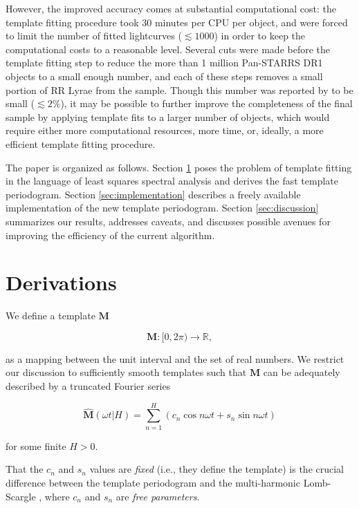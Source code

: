 \documentclass[apj]{emulateapj}
\begin{document}
However, the improved accuracy comes at substantial computational cost: the template fitting
procedure took 30 minutes per CPU per object, and \cite{Sesar_etal_2016} were forced to limit
the number of fitted lightcurves ($\lesssim 1000$) in order to keep the computational costs
to a reasonable level. Several cuts were made before the template fitting step to reduce the
more than 1 million Pan-STARRS DR1 objects to a small enough number, and each of these steps
removes a small portion of RR Lyrae from the sample. Though this number was reported by
\cite{Sesar_etal_2016} to be small ($\lesssim 2\%$), it may be possible to further improve
the completeness of the final sample by applying template fits to a larger number of objects,
which would require either more computational resources, more time, or, ideally, a more efficient
template fitting procedure.

The paper is organized as follows. Section \ref{sec:derivations} poses the problem of template
fitting in the language of least squares spectral analysis and derives the fast template
periodogram. Section \ref{sec:implementation} describes a freely available implementation
of the new template periodogram. Section \ref{sec:discussion} summarizes our results,
addresses caveats, and discusses possible avenues for improving the efficiency of the current
algorithm.


\section{Derivations}\label{sec:derivations}

We define a template $\mathbf{M}$

\begin{equation}
    \mathbf{M} : [0, 2\pi)\rightarrow\mathbb{R},
\end{equation}

\noindent as a mapping between the unit interval and the set of real numbers. We
restrict our discussion to sufficiently smooth templates such that
$\mathbf{M}$ can be adequately described by a truncated Fourier series

\begin{equation}
    \hat{\mathbf{M}}(\omega t|H) = \sum_{n=1}^H\left(c_n\cos{n\omega t} + s_n\sin{n\omega t}\right)
\end{equation}

\noindent for some finite $H > 0$.

That the $c_n$ and $s_n$ values are \emph{fixed} (i.e., they define
the template) is the crucial difference between the template periodogram and
the multi-harmonic Lomb-Scargle \citep{Palmer_2009,Bretthorst+Chi-Cheng_1988}, where $c_n$ and $s_n$
are \emph{free parameters}.
\end{document}
